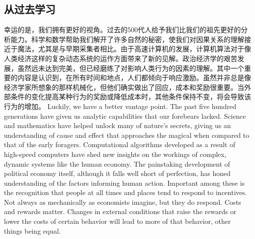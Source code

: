 \subsection{从过去学习}
\begin{paracol}{2}
幸运的是，我们拥有更好的视角。过去的500代人给予我们比我们的祖先更好的分析能力。科学和数学帮助我们解开了许多自然的秘密，使我们对因果关系的理解接近于魔法，尤其是与早期采集者相比。由于高速计算机的发展，计算机算法对于像人类经济这样的复杂动态系统的运作方面带来了新的见解。政治经济学的艰苦发展，虽然远未达到完美，但已经磨练了对影响人类行为的因素的理解。其中一个重要的内容是认识到，在所有时间和地点，人们都倾向于响应激励。虽然并非总是像经济学家所想象的那样机械化，但他们确实做出了回应，成本和奖励很重要。当外部条件的变化提高某种行为的奖励或降低成本时，其他条件保持不变，将会导致该行为的增加。
\switchcolumn
Luckily, we have a better vantage point. The past five hundred generations have given us analytic capabilities that our forebears lacked. Science and mathematics have helped unlock many of nature's secrets, giving us an understanding of cause and effect that approaches the magical when compared to that of the early foragers. Computational algorithms developed as a result of high-speed computers have shed new insights on the workings of complex, dynamic systems like the human economy. The painstaking development of political economy itself, although it falls well short of perfection, has honed understanding of the factors informing human action. Important among these is the recognition that people at all times and places tend to respond to incentives. Not always as mechanically as economists imagine, but they do respond. Costs and rewards matter. Changes in external conditions that raise the rewards or lower the costs of certain behavior will lead to more of that behavior, other things being equal.
\end{paracol}

